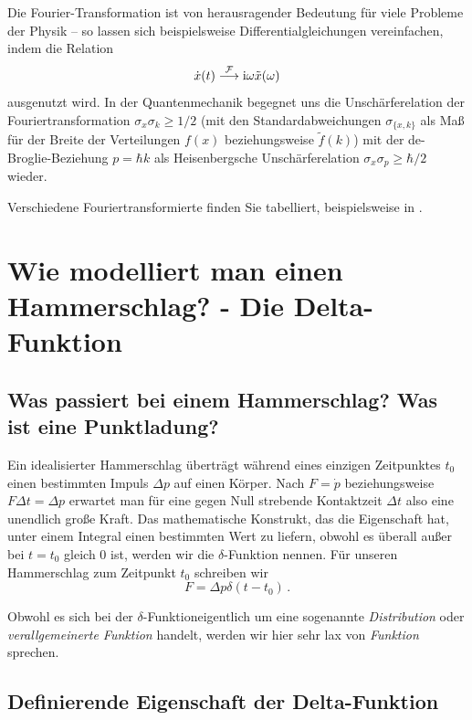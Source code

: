\documentclass[paper=a4, fontsize=11.0pt, abstractoff, DIV12]{scrartcl}
\begin{document}
Die Fourier-Transformation ist von herausragender Bedeutung
für viele Probleme der Physik -- so lassen sich beispielsweise
Differentialgleichungen vereinfachen, indem die Relation
\[ \dot x(t) \stackrel{\operatorname{\mathcal{F}}}{\longrightarrow} \mathrm{i}\omega \tilde x (\omega)\]
ausgenutzt wird. In der Quantenmechanik begegnet uns die Unschärferelation der
Fouriertransformation $\sigma_x \sigma_k \ge 1/2$ (mit den
Standardabweichungen $\sigma_{\{x,k\}}$ als Maß für der Breite der
Verteilungen $f(x)$ beziehungsweise $\tilde f(k)$) mit der
de-Broglie-Beziehung $p=\hbar k$ als Heisenbergsche Unschärferelation
$\sigma_x \sigma_p \ge \hbar/2$ wieder.

Verschiedene Fouriertransformierte finden Sie tabelliert, beispielsweise in
\cite{Gradshteyn}.


\section{Wie modelliert man einen Hammerschlag? - Die Delta-\glqq Funktion\grqq}

\subsection{Was passiert bei einem Hammerschlag? Was ist eine Punktladung?}

Ein idealisierter Hammerschlag überträgt während eines einzigen Zeitpunktes
$t_0$ einen bestimmten Impuls $\Delta p$ auf einen Körper. Nach $F=\dot{p}$
beziehungsweise $F\Delta t = \Delta p$ erwartet man für eine gegen Null
strebende Kontaktzeit $\Delta t$ also eine unendlich große Kraft. Das
mathematische Konstrukt, das die Eigenschaft hat, unter einem Integral
einen bestimmten Wert zu liefern, obwohl es überall außer bei $t=t_0$ gleich
$0$ ist, werden wir die $\delta$-Funktion nennen. Für unseren Hammerschlag
zum Zeitpunkt $t_0$ schreiben wir
\begin{equation}
F = \Delta p \delta(t-t_0)\,.
\end{equation}

Obwohl es sich bei der $\delta$-\glqq Funktion\grqq eigentlich um eine
sogenannte \emph{Distribution} oder \emph{verallgemeinerte Funktion}
handelt, werden wir hier sehr lax von \emph{Funktion} sprechen.

\subsection{Definierende Eigenschaft der Delta-Funktion}
\end{document}
